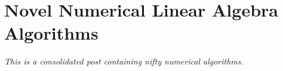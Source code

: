 \section{Novel Numerical Linear Algebra Algorithms}

\emph{This is a consolidated post containing nifty numerical algorithms.}



